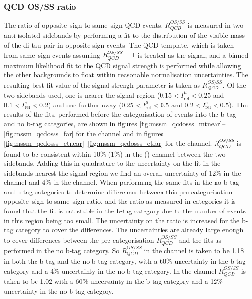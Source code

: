 \subsubsection{QCD OS/SS ratio}
\label{sec:mssm_bkgs_etmt_qcdosss}
The ratio of opposite--sign to same--sign QCD events, $R_{QCD}^{OS/SS}$ is measured
in two anti-isolated sidebands by performing a fit to the distribution of the
visible mass of the di-tau pair in 
opposite-sign events. The QCD template, which is taken from same--sign events 
assuming $R_{QCD}^{OS/SS} = 1$ is treated as the signal, and a binned maximum
likelihood fit to the QCD signal strength is performed while allowing the other
backgrounds to float within reasonable normalisation uncertainties. The
resulting best fit value of the signal strengh parameter is taken as $R_{QCD}^{OS/SS}$.
Of the two sidebands used, one is nearer the signal region ($0.15<I_{\text{rel}}^{\mu}<0.25$ and $0.1<I_{\text{rel}}^{e}<0.2$)
and one further away ($0.25<I_{\text{rel}}^{\mu}<0.5$ and $0.2<I_{\text{rel}}^{e}<0.5$). The results of the fits,
performed before the categorisation of events into the b-tag and no b-tag categories, are shown in figures \ref{fig:mssm_qcdosss_mtnear}--\ref{fig:mssm_qcdosss_far}
for the \mutau channel and in figures \ref{fig:mssm_qcdosss_etnear}--\ref{fig:mssm_qcdosss_etfar} for the \etau channel.
$R_{QCD}^{OS/SS}$ is found to be consistent within 10\% (1\%) in the \etau (\mutau) channel between the two sidebands.
Adding this in quadrature to the uncertainty on the fit in the sidebands nearest the signal region we find
an overall uncertainty of 12\% in the \etau channel and 4\% in the \mutau channel.
When performing the same fits in the no b-tag and b-tag categories to determine differences between
this pre-categorisation opposite--sign to same--sign ratio, and the ratio as measured in categories it is found that 
the fit is not stable in the b-tag category due to the number of events in this region being too small.
The uncertainty on the ratio is increased for the b-tag category to cover the differences.
The uncertainties are already large enough to cover differences between the pre-categorisation $R_{QCD}^{OS/SS}$ and the
fits as performed in the no b-tag category. So $R_{QCD}^{OS/SS}$ in the \mutau channel is taken to be
1.18 in both the b-tag and the no b-tag category, with a 60\% uncertainty in the b-tag category and a 4\% uncertainty in the no b-tag category.
In the \etau channel $R_{QCD}^{OS/SS}$ is taken to be 1.02 with a 60\% uncertainty in the b-tag category and a 12\% uncertainty
in the no b-tag category.

